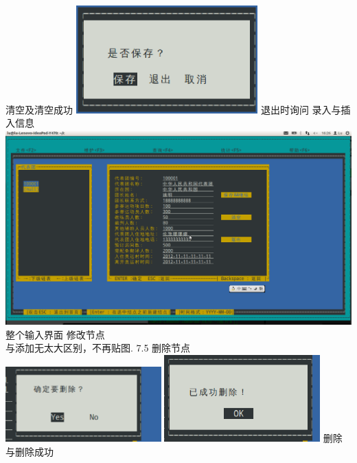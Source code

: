 \documentclass[10pt,a4paper]{article}
\begin{document}
\newline
清空及清空成功
\newline
\includegraphics[width=7cm]{exit}
\newline
退出时询问
 录入与插入信息 \\
\includegraphics[width=14cm]{addNode}
\newline
整个输入界面
 修改节点 \\
与添加无太大区别，不再贴图.
7.5 删除节点 \\
\includegraphics[width=6cm]{delete}
\includegraphics[width=6cm]{deletes}
\newline
删除与删除成功
\newline
\end{document}
